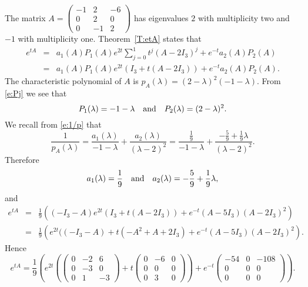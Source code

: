 \documentclass{ximera}
\begin{document}
\begin{computerExercise}
\begin{solution}
\soln The matrix 
$A = \left(\begin{array}{rrr} -1 & 2 & -6\\ 0 & 2 & 0 \\ 0 & -1 & 2
\end{array}\right)$ has eigenvalues $2$ with multiplicity two and $-1$ 
with multiplicity one. Theorem~\ref{T:etA} states that 
\begin{eqnarray*}
e^{tA} & = & a_1(A)P_1(A)e^{2t}\sum_{j=0}^1t^j(A-2I_3)^j+e^{-t}a_2(A)P_2(A)\\
 & = & a_1(A)P_1(A)e^{2t}(I_3+t(A-2I_3)) + e^{-t}a_2(A)P_2(A).
\end{eqnarray*}
The characteristic polynomial of $A$ is 
$p_A(\lambda) =(2-\lambda)^2(-1-\lambda)$.  From \eqref{e:Pj} we see that
\[
P_1(\lambda) = -1-\lambda \quad\mbox{and}\quad P_2(\lambda) = (2-\lambda)^2.
\]
We recall from \eqref{e:1/p} that 
\[
\frac{1}{p_A(\lambda)} = \frac{a_1(\lambda)}{-1-\lambda} + 
\frac{a_2(\lambda)}{(\lambda-2)^2} = \frac{\frac{1}{9}}{-1-\lambda}
+ \frac{-\frac{5}{9}+\frac{1}{9}\lambda}{(\lambda-2)^2}.
\]
Therefore
\[
a_1(\lambda) = \frac{1}{9} \quad\mbox{and}\quad a_2(\lambda) = -\frac{5}{9}+\frac{1}{9}\lambda,
\]
and
\begin{eqnarray*}
e^{tA} & = & \frac{1}{9}\left((-I_3-A)e^{2t}(I_3+t(A-2I_3)) + 
e^{-t}(A-5I_3)(A-2I_3)^2\right)\\
& = & 
\frac{1}{9}\left(e^{2t}((-I_3-A)+t(-A^2+A+2I_3)+e^{-t}(A-5I_3)(A-2I_3)^2\right).
\end{eqnarray*}
Hence
\[
e^{tA}= \frac{1}{9}\left(e^{2t}\left(\left(\begin{array}{rrr} 0 & -2 & 6\\ 
0 & -3 & 0\\ 0 & 1 & -3\end{array}\right)+t\left(\begin{array}{rrr} 0& -6 & 0\\ 
0 & 0 & 0\\ 0 & 3 & 0 \end{array}\right)\right)+e^{-t}\left(\begin{array}{rrr} 
-54 & 0 & -108\\ 0 & 0 & 0 \\ 0 & 0 & 0\end{array}\right)\right).
\]




\end{solution}
\end{computerExercise} 
\end{document}
